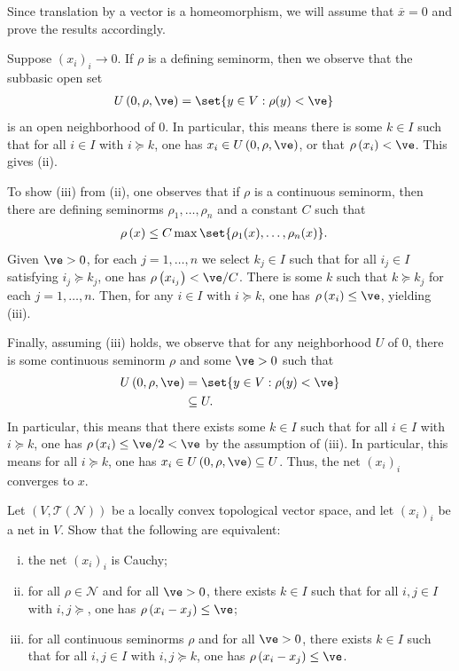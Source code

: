 \documentclass[10pt]{mypackage}
\begin{document}
\begin{solution}
  Since translation by a vector is a homeomorphism, we will assume that $ \overline{x} = 0 $ and prove the results accordingly.

  Suppose $\left( x_i \right)_i\rightarrow 0$. If $\rho$ is a defining seminorm, then we observe that the subbasic open set
  \begin{align*}
    U\left( 0,\rho,\ve \right) &= \set{y\in V : \rho(y) < \ve}
  \end{align*}
  is an open neighborhood of $0$. In particular, this means there is some $k\in I$ such that for all $i\in I$ with $i\succeq k$, one has $x_i\in U\left( 0,\rho,\ve \right)$, or that $\rho\left( x_i \right) < \ve$. This gives (ii).

  To show (iii) from (ii), one observes that if $\rho$ is a continuous seminorm, then there are defining seminorms $\rho_1,\dots,\rho_n$ and a constant $C$ such that
  \begin{align*}
    \rho\left( x \right) &\leq C \max\set{\rho_1(x),\dots,\rho_n(x)}.
  \end{align*}
  Given $\ve > 0$, for each $j=1,\dots,n$ we select $k_j\in I$ such that for all $i_j\in I$ satisfying $i_j \succeq k_j$, one has $\rho\left( x_{i_j} \right) < \ve/C$. There is some $k$ such that $k\succeq k_j$ for each $j=1,\dots,n$. Then, for any $i\in I$ with $i\succeq k$, one has $\rho\left(x_i\right)\leq \ve$, yielding (iii).

  Finally, assuming (iii) holds, we observe that for any neighborhood $U$ of $0$, there is some continuous seminorm $\rho$ and some $\ve > 0$ such that
  \begin{align*}
    U\left( 0,\rho,\ve \right) &= \set{y\in V : \rho(y) < \ve}\\
                               &\subseteq U.
  \end{align*}
  In particular, this means that there exists some $k\in I$ such that for all $i\in I$ with $i\succeq k$, one has $\rho\left( x_i \right)\leq \ve/2 < \ve$ by the assumption of (iii). In particular, this means for all $i\succeq k$, one has $x_i\in U\left( 0,\rho,\ve \right)\subseteq U$. Thus, the net $\left( x_i \right)_i$ converges to $x$.
\end{solution}
\begin{problem}[Problem II.3]
  Let $\left( V, \mathcal{T}\left( \mathcal{N} \right) \right)$ be a locally convex topological vector space, and let $\left( x_i \right)_i$ be a net in $V$. Show that the following are equivalent:
  \begin{enumerate}[(i)]
    \item the net $\left( x_i \right)_i$ is Cauchy;
    \item for all $\rho\in \mathcal{N}$ and for all $\ve > 0$, there exists $k\in I$ such that for all $i,j\in I$ with $i,j\succeq$, one has $\rho\left( x_i - x_j \right) \leq \ve$;
    \item for all continuous seminorms $\rho$ and for all $\ve > 0$, there exists $k\in I$ such that for all $i,j\in I$ with $i,j\succeq k$, one has $\rho\left( x_i-x_j \right) \leq \ve$.
  \end{enumerate}
\end{problem}
\end{document}
